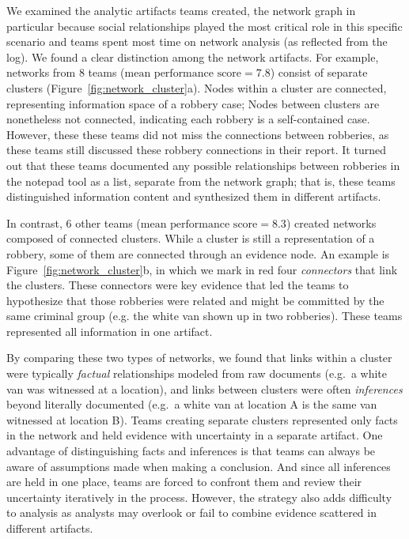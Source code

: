 We examined the analytic artifacts teams created, the network
graph in particular because social relationships played the most
critical role in this specific scenario and teams spent most time on
network analysis (as reflected from the log). We found a clear distinction among the network artifacts. For example, networks from
8 teams ($\text{mean performance score}=7.8$) consist of separate clusters
(Figure~\ref{fig:network_cluster}a). Nodes within a cluster are
connected, representing information space of a robbery case; Nodes
between clusters are nonetheless not connected, indicating each robbery
is a self-contained case. However, these these teams did not miss the connections between robberies, as these teams still discussed these robbery connections in their report.
It turned out that these teams documented any possible relationships between
robberies in the notepad tool as a list, separate from the network graph; that is, these teams distinguished information content and synthesized them in different artifacts.

In contrast, 6 other teams ($\text{mean performance score}=8.3$) created networks
composed of connected clusters. While a cluster is still a
representation of a robbery, some of them are connected through an
evidence node. An example is Figure~\ref{fig:network_cluster}b, in
which we mark in red four \emph{connectors} that link the clusters. These
connectors were key evidence that led the teams to hypothesize that
those robberies were related and might be committed by the same criminal
group (e.g. the white van shown up in two robberies). These teams represented all information in one artifact.

By comparing these two types of networks, we found that links within a cluster were typically
\emph{factual} relationships modeled from raw documents (e.g.~a white van was
witnessed at a location), and links between clusters were often
\emph{inferences} beyond literally documented (e.g.~a white van at location A
is the same van witnessed at location B). Teams creating separate
clusters represented only facts in the network and held evidence with
uncertainty in a separate artifact. One advantage of distinguishing
facts and inferences is that teams can always be aware of assumptions made when
making a conclusion. And since all inferences are held in one place,
teams are forced to confront them and review their uncertainty
iteratively in the process. However, the strategy also adds difficulty
to analysis as analysts may overlook or fail to combine evidence
scattered in different artifacts.

